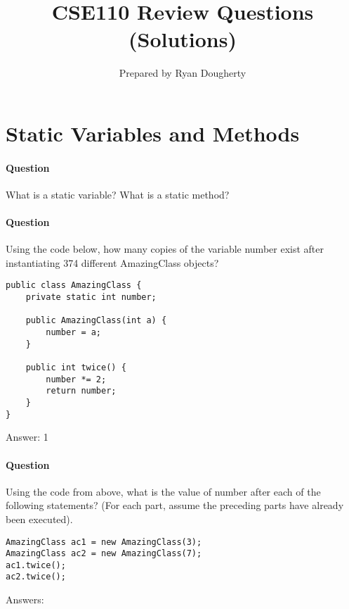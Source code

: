 \documentclass{article}
\title{CSE110 Review Questions (Solutions)}
\author{Prepared by Ryan Dougherty}
\date{}
\begin{document}
\maketitle

\section{Static Variables and Methods}


\setcounter{question_num}{1}
\paragraph{Question }
What is a static variable? What is a static method?

\addtocounter{question_num}{1}
\paragraph{Question }
Using the code below, how many copies of the variable number exist after instantiating 374 different AmazingClass objects?
\begin{lstlisting}
public class AmazingClass {
	private static int number;

	public AmazingClass(int a) {
		number = a;
	}

	public int twice() {
		number *= 2;
		return number;
	}
}
\end{lstlisting}
{\color{red}Answer: 1}

\addtocounter{question_num}{1}
\paragraph{Question }
Using the code from above, what is the value of number after each of the following statements? (For each part, assume the preceding parts have already been executed).
\begin{lstlisting}
AmazingClass ac1 = new AmazingClass(3); 
AmazingClass ac2 = new AmazingClass(7);
ac1.twice();
ac2.twice();
\end{lstlisting}
{\color{red}Answers:
}
\end{document}
